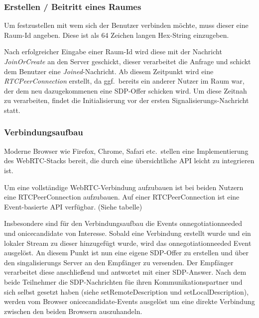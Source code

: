 \documentclass{IEEEtran}
\begin{document}
\begin{twocolumn}
\subsubsection{Erstellen / Beitritt eines Raumes}

Um festzustellen mit wem sich der Benutzer verbinden möchte, muss dieser
eine Raum-Id angeben. Diese ist als 64 Zeichen langen Hex-String einzugeben.

Nach erfolgreicher Eingabe einer Raum-Id wird diese mit der Nachricht
\textit{JoinOrCreate} an den Server geschickt, dieser verarbeitet die Anfrage
und schickt dem Benutzer eine \textit{Joined}-Nachricht. Ab diesem Zeitpunkt
wird eine \textit{RTCPeerConnection} erstellt, da ggf.\ bereits ein anderer
Nutzer im Raum war, der dem neu dazugekommenen eine SDP-Offer schicken wird.
Um diese Zeitnah zu verarbeiten, findet die Initialisierung vor der ersten
Signalisierungs-Nachricht statt.


\subsubsection{Verbindungsaufbau}\label{browser-webrtc}

Moderne Browser wie Firefox, Chrome, Safari etc.\ stellen eine Implementierung
des WebRTC-Stacks bereit, die durch eine übersichtliche API leicht zu
integrieren ist. %

Um eine vollständige WebRTC-Verbindung aufzubauen ist bei beiden Nutzern eine
RTCPeerConnection aufzubauen. Auf einer RTCPeerConnection ist eine
Event-basierte API verfügbar. (Siehe tabelle)


Insbesondere sind für den Verbindungsaufbau die Events onnegotiationneeded und
onicecandidate von Interesse. Sobald eine Verbindung erstellt wurde und ein
lokaler Stream zu dieser hinzugefügt wurde, wird das onnegotiationneeded Event
ausgelöst. An diesem Punkt ist nun eine eigene SDP-Offer zu erstellen und über
den singalisierungs Server an den Empfänger zu versenden. Der Empfänger
verarbeitet diese anschließend und antwortet mit einer SDP-Answer. Nach dem
beide Teilnehmer die SDP-Nachrichten füe ihren Kommunikationspartner und sich
selbst gesetzt haben (siehe setRemoteDescription und setLocalDescription),
werden vom Browser onicecandidate-Events ausgelöst um eine direkte Verbindung
zwischen den beiden Browsern auszuhandeln.


\end{twocolumn}
\end{document}
